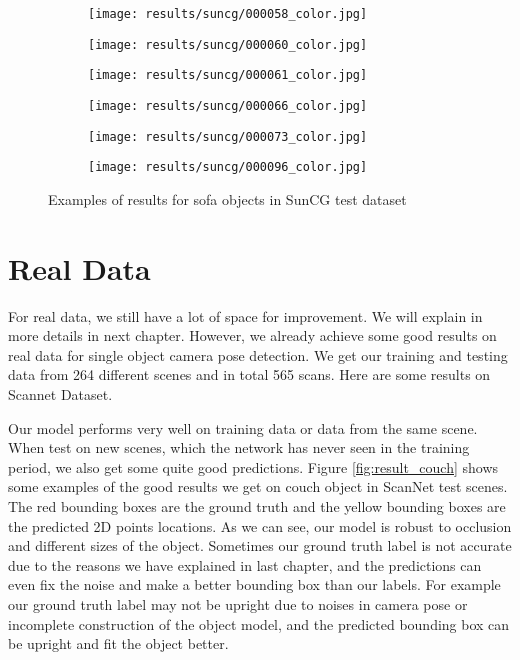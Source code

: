 \begin{figure}[h!]
\begin{subfigure}[b]{0.32\linewidth}
    \texttt{[image: results/suncg/000058\_color.jpg]}
  \end{subfigure}
  \begin{subfigure}[b]{0.32\linewidth}
    \texttt{[image: results/suncg/000060\_color.jpg]}
  \end{subfigure}
  \begin{subfigure}[b]{0.32\linewidth}
    \texttt{[image: results/suncg/000061\_color.jpg]}
  \end{subfigure}
  \begin{subfigure}[b]{0.32\linewidth}
    \texttt{[image: results/suncg/000066\_color.jpg]}
  \end{subfigure}
  \begin{subfigure}[b]{0.32\linewidth}
    \texttt{[image: results/suncg/000073\_color.jpg]}
  \end{subfigure}
  \begin{subfigure}[b]{0.32\linewidth}
    \texttt{[image: results/suncg/000096\_color.jpg]}
  \end{subfigure}
  \caption{Examples of results for sofa objects in SunCG test dataset}
  \label{fig:suncg}
\end{figure}

\section{Real Data}

For real data, we still have a lot of space for improvement. We will explain in more details in next chapter. However, we already achieve some good results on real data for single object camera pose detection. We get our training and testing data from 264 different scenes and in total 565 scans. Here are some results on Scannet Dataset.

Our model performs very well on training data or data from the same scene. When test on new scenes, which the network has never seen in the training period, we also get some quite good predictions. Figure \ref{fig:result_couch} shows some examples of the good results we get on couch object in ScanNet test scenes. The red bounding boxes are the ground truth and the yellow bounding  boxes are the predicted 2D points locations. As we can see, our model is robust to occlusion and different sizes of the object. Sometimes our ground truth label is not accurate due to the reasons we have explained in last chapter, and the predictions can even fix the noise and make a better bounding box than our labels. For example our ground truth label may not be upright due to noises in camera pose or incomplete construction of the object model, and the predicted bounding box can be upright and fit the object better.

